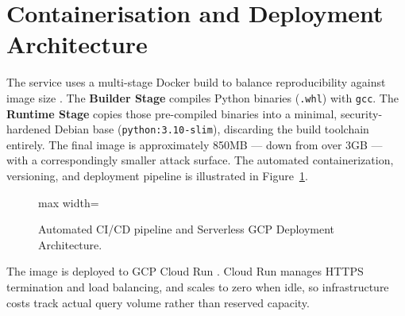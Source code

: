 \section{Containerisation and Deployment Architecture}
\label{sec:containerization}

The service uses a multi-stage Docker build to balance reproducibility against image size \cite{merkel2014docker}. The \textbf{Builder Stage} compiles Python binaries (\texttt{.whl}) with \texttt{gcc}. The \textbf{Runtime Stage} copies those pre-compiled binaries into a minimal, security-hardened Debian base (\texttt{python:3.10-slim}), discarding the build toolchain entirely. The final image is approximately 850MB --- down from over 3GB --- with a correspondingly smaller attack surface. The automated containerization, versioning, and deployment pipeline is illustrated in Figure~\ref{fig:container_deployment_workflow}.

\begin{figure}[H]
  \centering
  \begin{adjustbox}{max width=\textwidth}
  \end{adjustbox}
  \caption{Automated CI/CD pipeline and Serverless GCP Deployment Architecture.}
  \label{fig:container_deployment_workflow}
\end{figure}

The image is deployed to GCP Cloud Run \cite{biswas2022gcp}. Cloud Run manages HTTPS termination and load balancing, and scales to zero when idle, so infrastructure costs track actual query volume rather than reserved capacity.

